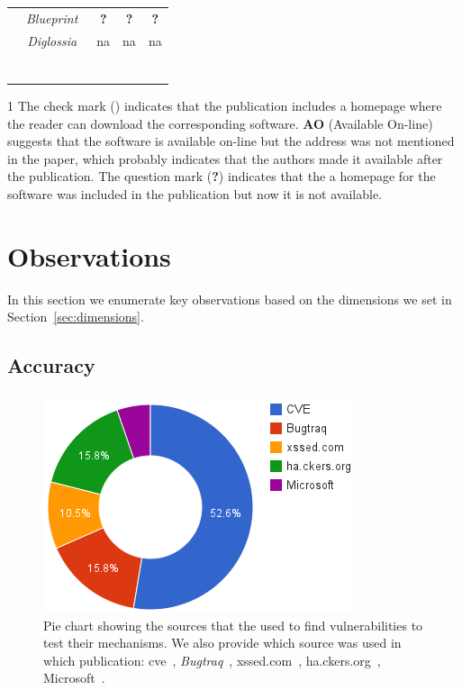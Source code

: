 \documentclass[conference]{IEEEtran}
\makeatletter
\newcommand{\tick}{\ding{52}}
\newcommand{\thickhline}{%
    \noalign {\ifnum 0=`}\fi \hrule height 1pt
    \futurelet \reserved@a \@xhline
}
\makeatother
\begin{document}
\begin{table}
\begin{threeparttable}
\begin{small}
{\begin{tabular}{l|c|ccc}
  &   {\it Blueprint}~\cite{LV09} & {\bf ?} & {\bf ?} & {\bf ?} \\
  &   {\it Diglossia}~\cite{SMS13} & {\sc na} & {\sc na} & {\sc na} \\
  \thickhline
    \end{tabular}}
    \begin{tablenotes}
  \begin{footnotesize}
       \item[1] The check mark (\tick) indicates that the publication
       includes a homepage where the reader can 
       download the corresponding software. {\bf AO} (Available On-line) suggests
       that the software is available on-line but the
       address was not mentioned in the paper, which probably indicates that
       the authors made it available after the publication. The question 
       mark ({\bf ?}) indicates that the a homepage for the software
       was included
       in the publication but now it is not available.
  \end{footnotesize}
    \end{tablenotes}
    \end{small}
    \end{threeparttable}
\end{table}

\section{Observations}
\label{sec:discussion}

In this section we enumerate key observations
based on the dimensions we set in Section~\ref{sec:dimensions}.

\subsection{Accuracy}

\begin{figure}
\begin{center}
\leavevmode
\includegraphics[scale=0.47]{defect-percentages.png}
\end{center}
\caption{\label{fig:defect_sources}Pie chart showing the sources
that the used to find vulnerabilities to test
their mechanisms. We also provide which source was used
in which publication:
{\sc cve}~\cite{XBS06,NLC07,PMP11,BK04,BV08,JB07,SMS13,WPLKK09,JKK06a,PS11},
{\it Bugtraq}~\cite{PB05,KKVJ06,JEP08},
{\sc xss}ed.com~\cite{NSS06,APKLM10},
ha.ckers.org~\cite{TNH07,PSC09,LV09},
Microsoft~\cite{RDWDE07}.}
\end{figure}
\end{document}
